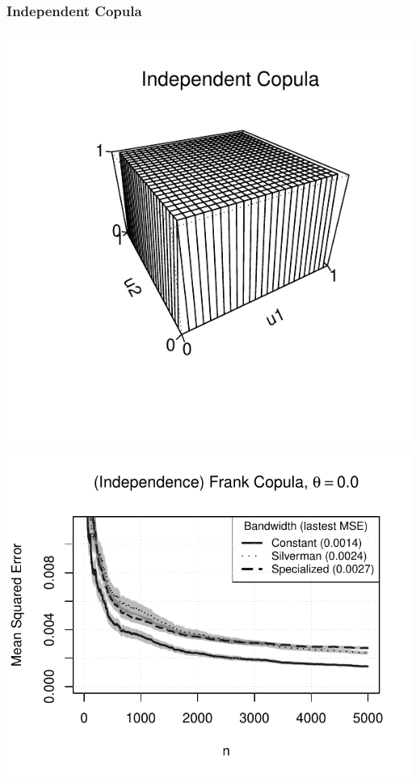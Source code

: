 \documentclass[aspectratio=169]{beamer}
\begin{document}
		\subsubsection{Independent Copula}
			\begin{frame}
				\frametitle{\insertsubsubsection}
				
				\begin{flushleft}
					\includegraphics[width=0.4\linewidth]{plots/numerical_results/frank0}
					\includegraphics[width=0.5\linewidth]{../text/plots/experiment_results/frank0}
				\end{flushleft}

			\end{frame}
			
\end{document}
